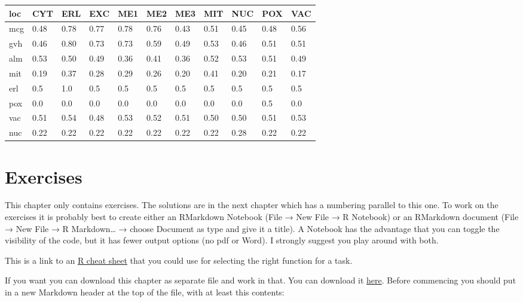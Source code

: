 \documentclass[]{book}
\begin{document}
\begin{tabular}{l|l|l|l|l|l|l|l|l|l|l}
\hline
loc & CYT & ERL & EXC & ME1 & ME2 & ME3 & MIT & NUC & POX & VAC\\
\hline
mcg & 0.48 & 0.78 & 0.77 & 0.78 & 0.76 & 0.43 & 0.51 & 0.45 & 0.48 & 0.56\\
\hline
gvh & 0.46 & 0.80 & 0.73 & 0.73 & 0.59 & 0.49 & 0.53 & 0.46 & 0.51 & 0.51\\
\hline
alm & 0.53 & 0.50 & 0.49 & 0.36 & 0.41 & 0.36 & 0.52 & 0.53 & 0.51 & 0.49\\
\hline
mit & 0.19 & 0.37 & 0.28 & 0.29 & 0.26 & 0.20 & 0.41 & 0.20 & 0.21 & 0.17\\
\hline
erl & 0.5 & 1.0 & 0.5 & 0.5 & 0.5 & 0.5 & 0.5 & 0.5 & 0.5 & 0.5\\
\hline
pox & 0.0 & 0.0 & 0.0 & 0.0 & 0.0 & 0.0 & 0.0 & 0.0 & 0.5 & 0.0\\
\hline
vac & 0.51 & 0.54 & 0.48 & 0.53 & 0.52 & 0.51 & 0.50 & 0.50 & 0.51 & 0.53\\
\hline
nuc & 0.22 & 0.22 & 0.22 & 0.22 & 0.22 & 0.22 & 0.22 & 0.28 & 0.22 & 0.22\\
\hline
\end{tabular}

\hypertarget{exercises}{%
\chapter{Exercises}\label{exercises}}

This chapter only contains exercises. The solutions are in the next chapter which has a numbering parallel to this one. To work on the exercises it is probably best to create either an RMarkdown Notebook (File → New File → R Notebook) or an RMarkdown document (File → New File → R Markdown\ldots{} → choose Document as type and give it a title). A Notebook has the advantage that you can toggle the visibility of the code, but it has fewer output options (no pdf or Word). I strongly suggest you play around with both.

This is a link to an \href{figures/R_cheatsheet.pdf}{R cheat sheet} that you could use for selecting the right function for a task.

If you want you can download this chapter as separate file and work in that. You can download it \href{https://raw.githubusercontent.com/MichielNoback/davur1_gitbook/master/07-exercises.Rmd}{here}. Before commencing you should put in a new Markdown header at the top of the file, with at least this contents:
\end{document}
